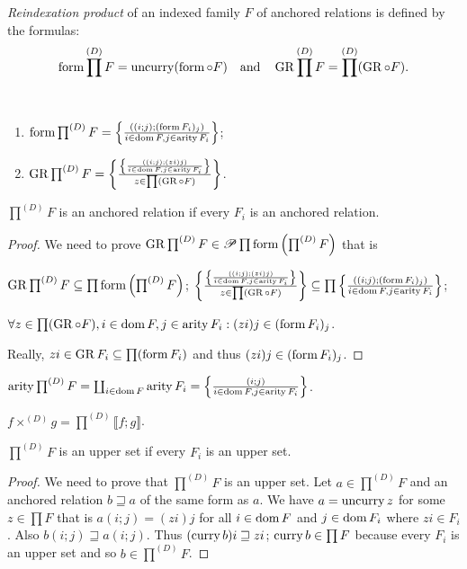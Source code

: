 \begin{defn}
\emph{Reindexation product} of an indexed
family $F$ of anchored relations is defined by the formulas: 
\[
\operatorname{form}\prod^{(D)}F=\operatorname{uncurry}(\operatorname{form}\circ F)\hspace{1em}\text{and}\hspace{1em}\operatorname{GR}\prod^{(D)}F=\prod^{(D)}(\operatorname{GR}\circ F).
\]
\end{defn}
\begin{obvious}
~
\begin{enumerate}
\item $\operatorname{form}\prod^{(D)}F=\left\{ \frac{((i;j);(\operatorname{form} F_{i})_{j})}{i\in\operatorname{dom} F,j\in\operatorname{arity} F_{i}}\right\}$;
\item $\operatorname{GR}\prod^{(D)}F=\left\{ \frac{\left\{ \frac{((i;j);(zi)j)}{i\in\operatorname{dom} F,j\in\operatorname{arity} F_{i}}\right\}}{z\in\prod(\operatorname{GR}\circ F)}\right\}$.
\end{enumerate}
\end{obvious}
\begin{prop}
$\prod^{(D)}F$ is an anchored relation if every $F_{i}$ is an anchored
relation.\end{prop}
\begin{proof}
We need to prove $\operatorname{GR}\prod^{(D)}F\in\mathscr{P}\prod\operatorname{form}\left(\prod^{(D)}F\right)$
that is

$\operatorname{GR}\prod^{(D)}F\subseteq\prod\operatorname{form}\left(\prod^{(D)}F\right)$; $\left\{ \frac{\left\{ \frac{((i;j);(zi)j)}{i\in\operatorname{dom} F,j\in\operatorname{arity} F_{i}}\right\}}{z\in\prod(\operatorname{GR}\circ F)}\right\}\subseteq\prod\left\{ \frac{((i;j);(\operatorname{form} F_{i})_{j})}{i\in\operatorname{dom} F,j\in\operatorname{arity} F_{i}}\right\}$;

$\forall z\in\prod(\operatorname{GR}\circ F),i\in\operatorname{dom} F,j\in\operatorname{arity} F_{i}:(zi)j\in(\operatorname{form} F_{i})_{j}$.

Really, $zi\in\operatorname{GR} F_{i}\subseteq\prod(\operatorname{form} F_{i})$ and thus $(zi)j\in(\operatorname{form} F_{i})_{j}$.\end{proof}
\begin{obvious}
$\operatorname{arity}\prod^{(D)}F=\coprod_{i\in\operatorname{dom} F}\operatorname{arity} F_{i}=\left\{ \frac{(i;j)}{i\in\operatorname{dom} F,j\in\operatorname{arity} F_{i}}\right\}$.\end{obvious}
\begin{defn}
$f\times^{(D)}g=\prod^{(D)}\llbracket f;g\rrbracket$.\end{defn}
\begin{lem}
$\prod^{(D)}F$ is an upper set if every $F_{i}$ is an upper set.\end{lem}
\begin{proof}
We need to prove that $\prod^{(D)}F$ is an upper set. Let $a\in\prod^{(D)}F$
and an anchored relation $b\sqsupseteq a$ of the same form as $a$.
We have $a=\operatorname{uncurry} z$ for some $z\in\prod F$ that is $a(i;j)=(zi)j$
for all $i\in\operatorname{dom} F$ and $j\in\operatorname{dom} F_{i}$ where $zi\in F_{i}$.
Also $b(i;j)\sqsupseteq a(i;j)$. Thus $(\operatorname{curry} b)i\sqsupseteq zi$;
$\operatorname{curry} b\in\prod F$ because every $F_{i}$ is an upper set and so
$b\in\prod^{(D)}F$.\end{proof}
